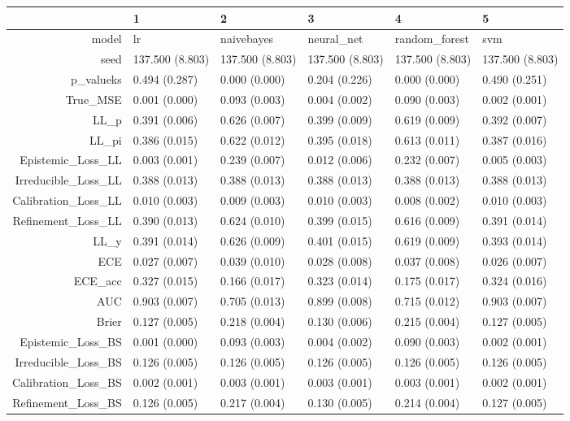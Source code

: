 \begin{table}[ht]
\centering
\begin{tabular}{rlllll}
  \hline
 & 1 & 2 & 3 & 4 & 5 \\ 
  \hline
model & lr & naivebayes & neural\_net & random\_forest & svm \\ 
  seed & 137.500 (8.803) & 137.500 (8.803) & 137.500 (8.803) & 137.500 (8.803) & 137.500 (8.803) \\ 
  p\_valueks & 0.494 (0.287) & 0.000 (0.000) & 0.204 (0.226) & 0.000 (0.000) & 0.490 (0.251) \\ 
  True\_MSE & 0.001 (0.000) & 0.093 (0.003) & 0.004 (0.002) & 0.090 (0.003) & 0.002 (0.001) \\ 
  LL\_p & 0.391 (0.006) & 0.626 (0.007) & 0.399 (0.009) & 0.619 (0.009) & 0.392 (0.007) \\ 
  LL\_pi & 0.386 (0.015) & 0.622 (0.012) & 0.395 (0.018) & 0.613 (0.011) & 0.387 (0.016) \\ 
  Epistemic\_Loss\_LL & 0.003 (0.001) & 0.239 (0.007) & 0.012 (0.006) & 0.232 (0.007) & 0.005 (0.003) \\ 
  Irreducible\_Loss\_LL & 0.388 (0.013) & 0.388 (0.013) & 0.388 (0.013) & 0.388 (0.013) & 0.388 (0.013) \\ 
  Calibration\_Loss\_LL & 0.010 (0.003) & 0.009 (0.003) & 0.010 (0.003) & 0.008 (0.002) & 0.010 (0.003) \\ 
  Refinement\_Loss\_LL & 0.390 (0.013) & 0.624 (0.010) & 0.399 (0.015) & 0.616 (0.009) & 0.391 (0.014) \\ 
  LL\_y & 0.391 (0.014) & 0.626 (0.009) & 0.401 (0.015) & 0.619 (0.009) & 0.393 (0.014) \\ 
  ECE & 0.027 (0.007) & 0.039 (0.010) & 0.028 (0.008) & 0.037 (0.008) & 0.026 (0.007) \\ 
  ECE\_acc & 0.327 (0.015) & 0.166 (0.017) & 0.323 (0.014) & 0.175 (0.017) & 0.324 (0.016) \\ 
  AUC & 0.903 (0.007) & 0.705 (0.013) & 0.899 (0.008) & 0.715 (0.012) & 0.903 (0.007) \\ 
  Brier & 0.127 (0.005) & 0.218 (0.004) & 0.130 (0.006) & 0.215 (0.004) & 0.127 (0.005) \\ 
  Epistemic\_Loss\_BS & 0.001 (0.000) & 0.093 (0.003) & 0.004 (0.002) & 0.090 (0.003) & 0.002 (0.001) \\ 
  Irreducible\_Loss\_BS & 0.126 (0.005) & 0.126 (0.005) & 0.126 (0.005) & 0.126 (0.005) & 0.126 (0.005) \\ 
  Calibration\_Loss\_BS & 0.002 (0.001) & 0.003 (0.001) & 0.003 (0.001) & 0.003 (0.001) & 0.002 (0.001) \\ 
  Refinement\_Loss\_BS & 0.126 (0.005) & 0.217 (0.004) & 0.130 (0.005) & 0.214 (0.004) & 0.127 (0.005) \\ 
   \hline
\end{tabular}
\end{table}

